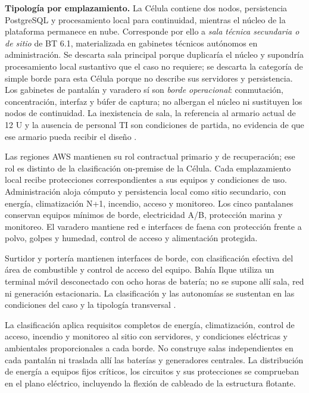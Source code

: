 \textbf{Tipología por emplazamiento.} La Célula contiene dos nodos, persistencia PostgreSQL y procesamiento local para continuidad, mientras el núcleo de la plataforma permanece en nube. Corresponde por ello a \emph{sala técnica secundaria o de sitio} de BT 6.1, materializada en gabinetes técnicos autónomos en administración. Se descarta sala principal porque duplicaría el núcleo y supondría procesamiento local sustantivo que el caso no requiere; se descarta la categoría de simple borde para esta Célula porque no describe sus servidores y persistencia. Los gabinetes de pantalán y varadero sí son \emph{borde operacional}: conmutación, concentración, interfaz y búfer de captura; no albergan el núcleo ni sustituyen los nodos de continuidad. La inexistencia de sala, la referencia al armario actual de 12 U y la ausencia de personal TI son condiciones de partida, no evidencia de que ese armario pueda recibir el diseño \parencites[secc.~6.1, p.~14]{pucv-transversal}[cap.~15, RT-06.01; cap.~17, secc.~17.4]{caso07}.

Las regiones AWS mantienen su rol contractual primario y de recuperación; ese rol es distinto de la clasificación on-premise de la Célula. Cada emplazamiento local recibe protecciones correspondientes a sus equipos y condiciones de uso.
Administración aloja cómputo y persistencia local como sitio secundario, con energía, climatización N+1, incendio, acceso y monitoreo. Los cinco pantalanes conservan equipos mínimos de borde, electricidad A/B, protección marina y monitoreo. El varadero mantiene red e interfaces de faena con protección frente a polvo, golpes y humedad, control de acceso y alimentación protegida.

Surtidor y portería mantienen interfaces de borde, con clasificación efectiva del área de combustible y control de acceso del equipo. Bahía Ilque utiliza un terminal móvil desconectado con ocho horas de batería; no se supone allí sala, red ni generación estacionaria. La clasificación y las autonomías se sustentan en las condiciones del caso y la tipología transversal \parencites[secc.~6.1, p.~14]{pucv-transversal}[cap.~15, RT-06.01 y RT-03.10]{caso07}.

La clasificación aplica requisitos completos de energía, climatización, control de acceso, incendio y monitoreo al sitio con servidores, y condiciones eléctricas y ambientales proporcionales a cada borde. No construye salas independientes en cada pantalán ni traslada allí las baterías y generadores centrales. La distribución de energía a equipos fijos críticos, los circuitos y sus protecciones se comprueban en el plano eléctrico, incluyendo la flexión de cableado de la estructura flotante.

